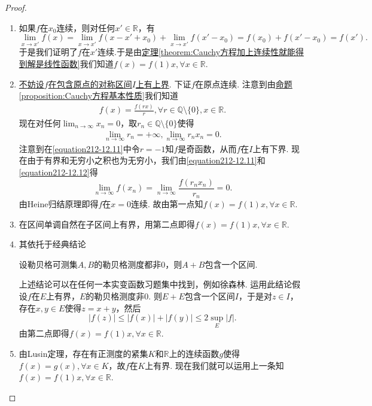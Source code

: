 \documentclass[lang=cn,newtx,10pt,scheme=chinese]{elegantbook}
\begin{document}
\begin{proof}
\begin{enumerate}
\item 如果\(f\)在\(x_0\)连续，则对任何\(x'\in\mathbb{R}\)，有
\[
\lim_{x\rightarrow x'} f(x)=\lim_{x\rightarrow x'} f(x - x'+x_0)+\lim_{x\rightarrow x'} f(x' - x_0)=f(x_0)+f(x' - x_0)=f(x').
\]
于是我们证明了\(f\)在\(x'\)连续.于是由\hyperref[theorem:Cauchy方程加上连续性就能得到解是线性函数]{定理\ref{theorem:Cauchy方程加上连续性就能得到解是线性函数}}我们知道\(f(x)=f(1)x,\forall x\in\mathbb{R}\).

\item \hyperlink{不妨设的原因112}{不妨设\(f\)在包含原点的对称区间\(I\)上有上界}. 下证\(f\)在原点连续. 注意到由\hyperref[proposition:Cauchy方程基本性质]{命题\ref{proposition:Cauchy方程基本性质}}我们知道
\begin{align}
f(x)=\frac{f(rx)}{r},\forall r\in\mathbb{Q}\setminus\{0\},x\in\mathbb{R}.\label{equation212-12.11}
\end{align}
现在对任何\(\lim_{n\rightarrow\infty}x_n = 0\)，取\(r_n\in\mathbb{Q}\setminus\{0\}\)使得
\begin{align}
\lim_{n\rightarrow\infty}r_n=+\infty,\lim_{n\rightarrow\infty}r_nx_n = 0.\label{equation212-12.12} 
\end{align}
注意到在\eqref{equation212-12.11}中令\(r = -1\)知\(f\)是奇函数，从而\(f\)在\(I\)上有下界. 现在由于有界和无穷小之积也为无穷小，我们由\eqref{equation212-12.11}和\eqref{equation212-12.12}得
\[
\lim_{n\rightarrow\infty} f(x_n)=\lim_{n\rightarrow\infty}\frac{f(r_nx_n)}{r_n}=0.
\]
由Heine归结原理即得\(f\)在\(x = 0\)连续. 故由第一点知\(f(x)=f(1)x,\forall x\in\mathbb{R}\).

\item 在区间单调自然在子区间上有界，用第二点即得\(f(x)=f(1)x,\forall x\in\mathbb{R}\).

\item 其依托于经典结论
\begin{conclusion}
设勒贝格可测集\(A,B\)的勒贝格测度都非\(0\)，则\(A + B\)包含一个区间.
\end{conclusion}
上述结论可以在任何一本实变函数习题集中找到，例如徐森林. 运用此结论假设\(f\)在\(E\)上有界，\(E\)的勒贝格测度非\(0\). 则\(E + E\)包含一个区间\(I\)，于是对\(z\in I\)，存在\(x,y\in E\)使得\(z = x + y\)，然后
\[
|f(z)|\leqslant|f(x)|+|f(y)|\leqslant 2\sup_E|f|.
\]
由第二点即得\(f(x)=f(1)x,\forall x\in\mathbb{R}\).

\item 由Lusin定理，存在有正测度的紧集\(K\)和\(\mathbb{R}\)上的连续函数\(g\)使得\(f(x)=g(x),\forall x\in K\)，故\(f\)在\(K\)上有界.
现在我们就可以运用上一条知\(f(x)=f(1)x,\forall x\in\mathbb{R}\).


\end{enumerate}
\end{proof}
\end{document}
